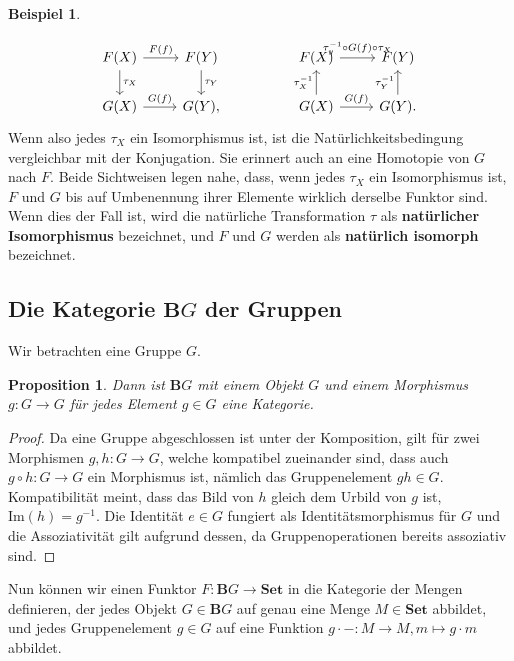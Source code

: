 \documentclass{article}
\theoremstyle{plain}
\newtheorem{prop}[thm]{Proposition}
\theoremstyle{definition}
\newtheorem{exmp}{Beispiel}[section]
\theoremstyle{remark}
\begin{document}
\begin{exmp}
\begin{enumerate}
\begin{equation}
\begin{tikzcd}
		F(X) \arrow[r, "F(f)"] \arrow[d, "\tau_X"] & F(Y) \arrow[d, "\tau_Y"] &  & F(X) \arrow[r, "\tau_y^{-1} \circ G(f) \circ \tau_X"] & F(Y)                           \\
		G(X) \arrow[r, "G(f)"]                     & {G(Y),}                  &  & G(X) \arrow[u, "\tau_X^{-1}"] \arrow[r, "G(f)"]       & G(Y). \arrow[u, "\tau_Y^{-1}"]
		\end{tikzcd}
	\end{equation}
	Wenn also jedes $\tau_X$ ein Isomorphismus ist, ist die Natürlichkeitsbedingung vergleichbar mit der Konjugation. Sie erinnert auch an eine Homotopie von $G$ nach $F$. Beide Sichtweisen legen nahe, dass, wenn jedes $\tau_X$ ein Isomorphismus ist, $F$ und $G$ bis auf Umbenennung ihrer Elemente wirklich derselbe Funktor sind. Wenn dies der Fall ist, wird die natürliche Transformation $\tau$ als \textbf{natürlicher Isomorphismus} bezeichnet, und $F$ und $G$ werden als \textbf{natürlich isomorph} bezeichnet.
\end{enumerate}
\end{exmp}

\subsection{Die Kategorie $\textbf{B}G$ der Gruppen}
Wir betrachten eine Gruppe $G$.

\begin{prop}
Dann ist $\textbf{B}G$ mit einem Objekt $G$ und einem Morphismus $g: G \rightarrow G$ für jedes Element $g \in G$ eine Kategorie.
\end{prop}

\begin{proof} Da eine Gruppe abgeschlossen ist unter der Komposition, gilt für zwei Morphismen $g,h: G \rightarrow G$, welche kompatibel zueinander sind, dass auch $g \circ h : G \rightarrow G$ ein Morphismus ist, nämlich das Gruppenelement $gh \in G$. Kompatibilität meint, dass das Bild von $h$ gleich dem Urbild von $g$ ist, $\text{Im}(h) = g^{-1}$. Die Identität $e \in G$ fungiert als Identitätsmorphismus für $G$ und die Assoziativität gilt aufgrund dessen, da Gruppenoperationen bereits assoziativ sind.
\end{proof}

Nun können wir einen Funktor $F: \textbf{B}G \rightarrow \textbf{Set}$ in die Kategorie der Mengen definieren, der jedes Objekt $G \in \textbf{B}G$ auf genau eine Menge $M \in \textbf{Set}$ abbildet, und jedes Gruppenelement $g \in G$ auf eine Funktion $g \cdot - : M \rightarrow M, m \mapsto g \cdot m$ abbildet.
\end{document}
